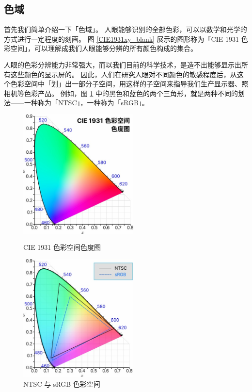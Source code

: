 \subsection{色域}

首先我们简单介绍一下「色域」。
人眼能够识别的全部色彩，可以以数学和光学的方式进行一定程度的刻画。
图 \ref{CIE1931xy_blank} 展示的图形称为「CIE 1931 色彩空间」，可以理解成我们人眼能够分辨的所有颜色构成的集合。

人眼的色彩分辨能力非常强大，而以我们目前的科学技术，是造不出能够显示出所有这些颜色的显示屏的。
因此，人们在研究人眼对不同颜色的敏感程度后，从这个色彩空间中「划」出一部分子空间，用这样的子空间来指导我们生产显示器、照相机等色彩产品。
例如，图 \ref{NTSC_sRGB} 中的黑色和蓝色的两个三角形，就是两种不同的划法——一种称为「NTSC」，一种称为「sRGB」。

\begin{figure}[htb!]
  \begin{minipage}{6.5cm}
    \centering
    \includegraphics[width=6cm]{assets/CIE1931xy_blank.jpg}
    \caption{CIE 1931 色彩空间色度图}
    \label{CIE1931xy_blank}
  \end{minipage}
  \qquad
  \begin{minipage}{6.5cm}
  \centering
  \includegraphics[width=6cm]{assets/NTSC_sRGB.jpg}
  \caption{NTSC 与 sRGB 色彩空间}
  \label{NTSC_sRGB}
  \end{minipage}
\end{figure}

